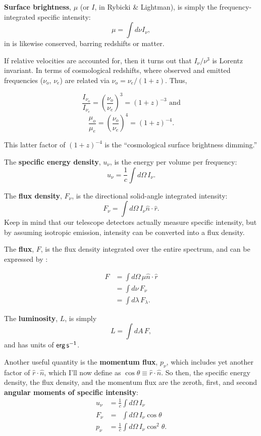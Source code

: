 \documentclass{tufte-handout}
\renewcommand{\textbf}[1]{{\bf \textcolor{dark-gray}{#1}}}
\renewcommand{\rm}{\sf}
\begin{document}
\textbf{Surface brightness}, $\mu$ (or $I$, in Rybicki \& Lightman), is simply the frequency-integrated specific intensity:
\begin{equation}
\mu = \int d\nu I_\nu,
\end{equation}
in is likewise conserved, barring redshifts or matter.

If relative velocities are accounted for, then it turns out that $I_\nu / \nu^3$ is Lorentz invariant. In terms of cosmological redshifts, where observed and emitted frequencies ($\nu_o$, $\nu_e$) are related via $\nu_o = \nu_e / (1+z)$. Thus,

\[\frac{I_{\nu_o}}{I_{\nu_e}} = \left (\frac{\nu_o}{\nu_e}\right )^3 = \left (1 + z\right )^{-3}\text{ and}\]
\[\frac{\mu_o}{\mu_e} = \left (\frac{\nu_o}{\nu_e}\right )^4 = \left (1 + z\right )^{-4}.\]

This latter factor of $(1+z)^{-4}$ is the ``cosmological surface brightness dimming.''

The \textbf{specific energy density}, $u_\nu$, is the energy per volume per frequency:
\begin{equation}
u_\nu = \frac{1}{c}\int d\Omega \, I_\nu.
\end{equation}

The \textbf{flux density}, $F_\nu$, is the directional solid-angle integrated intensity:
\begin{equation}
F_\nu = \int d\Omega \, I_\nu \hat n \cdot \hat r.
\end{equation}
Keep in mind that our telescope detectors actually measure specific intensity, but by assuming isotropic emission, intensity can be converted into a flux density.

The \textbf{flux}, $F$, is the flux density integrated over the entire spectrum, and can be expressed by :

\begin{align}
F &= \int d\Omega\, \mu \hat n \cdot \hat r \nonumber \\ 
  &= \int d\nu\, F_\nu \\ 
  &= \int d\lambda\, F_\lambda \nonumber.
\end{align}

The \textbf{luminosity}, $L$, is simply
\begin{equation}
L = \int dA \, F,
\end{equation}
and has units of $\rm erg\, s^{-1}$.


Another useful quantity is the \textbf{momentum flux}, $p_\nu$, which includes yet another factor of $\hat r \cdot \hat n$, which I'll now define as $\cos \theta \equiv \hat r \cdot \hat n$. So then, the specific energy density, the flux density, and the momentum flux are the zeroth, first, and second \textbf{angular moments of specific intensity}:
\begin{align}
u_\nu &= \frac{1}{c} \int d\Omega \, I_\nu\nonumber \\
F_\nu &= \phantom{\frac{1}{c}} \int d\Omega \, I_\nu \cos\theta \\
p_\nu &= \frac{1}{c} \int d\Omega\, I_\nu \cos^2 \theta. \nonumber 
\end{align}
\end{document}
